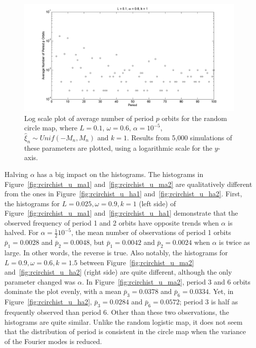 \begin{figure}[H]\linespread{1}
\caption[Log scale plot of average number of period $p$ orbits for the random circle
map (uniform distribution), for $\alpha=10^{-5}$, $\omega=0.6$ and
$k=1$]{Log scale plot of average number of period $p$ orbits for the random circle map,
  where $L=0.1$, $\omega =0.6$, $\alpha = 10^{-5}$, $\hat{\xi}_n\sim
  Unif(-M_n,M_n)$ and $k=1$. Results from 5,000 simulations of these
  parameters are plotted, using a logarithmic scale for the
  $y$-axis.}\label{fig:avgcircorbs}
	\begin{center}		\includegraphics[width=.8\textwidth]{figs/rcirc_avg_num_1000_sim_logscale.png}
	\end{center}
\end{figure}

Halving $\alpha$ has a big impact on the histograms. The histograms in
Figure~\ref{fig:rcirchist_u_ma1} and~\ref{fig:rcirchist_u_ma2} are
qualitatively different from the ones in Figure~\ref{fig:rcirchist_u_ha1}
and~\ref{fig:rcirchist_u_ha2}. First, the histograms for $L=0.025,
\omega = 0.9, k = 1$ (left side)
of Figure~\ref{fig:rcirchist_u_ma1} and~\ref{fig:rcirchist_u_ha1} demonstrate that the observed frequency of
period 1 and 2 orbits have opposite trends when $\alpha$ is
halved. For $\alpha = \frac{1}{2}10^{-5}$, the mean number of
observations of period 1 orbits $\bar{p}_1=0.0028$ and
$\bar{p}_2=0.0048$, but $\bar{p}_1=0.0042$ and
$\bar{p}_2=0.0024$ when $\alpha$ is twice as large. In other words,
the reverse is true. Also notably, the histograms for $L=0.9, \omega = 0.6, k=1.5$ between Figure~\ref{fig:rcirchist_u_ma2}
and~\ref{fig:rcirchist_u_ha2} (right side) are quite different, although the only
parameter changed was $\alpha$. In Figure~\ref{fig:rcirchist_u_ma2},
period 3 and 6 orbits dominate the plot evenly, with a mean $\bar{p}_3=0.0378$ and $\bar{p}_6=0.0334$. Yet, in
Figure~\ref{fig:rcirchist_u_ha2}, $\bar{p}_3=0.0284$ and
$\bar{p}_6=0.0572$; period 3 is half as frequently observed than
period 6. Other than these two observations, the histograms are quite
similar. Unlike the random logistic map, it does not seem that the
distribution of period is consistent in the circle map when the
variance of the Fourier modes is reduced.  

